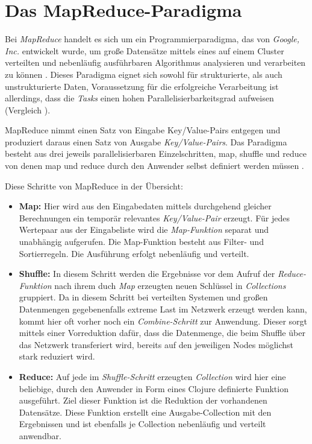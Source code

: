 \section{Das MapReduce-Paradigma}
\label{section:das mapreduce-paradigma}

Bei \textit{MapReduce} handelt es sich um ein Programmierparadigma, das von \textit{Google, Inc.} entwickelt wurde, um große Datensätze mittels eines auf einem Cluster verteilten und nebenläufig ausführbaren Algorithmus analysieren und verarbeiten zu können . Dieses Paradigma eignet sich sowohl für strukturierte, als auch unstrukturierte Daten, Voraussetzung für die erfolgreiche Verarbeitung ist allerdings, dass die \textit{Tasks} einen hohen Parallelisierbarkeitsgrad aufweisen (Vergleich ).  

MapReduce nimmt einen Satz von Eingabe Key/Value-Pairs entgegen und produziert daraus einen Satz von Ausgabe \textit{Key/Value-Pairs}. Das Paradigma besteht aus drei jeweils parallelisierbaren Einzelschritten, map, shuffle und reduce von denen map und reduce durch den Anwender selbst definiert werden müssen . 

Diese Schritte von MapReduce in der Übersicht: 

\begin{itemize}

\item \textbf{Map:} Hier wird aus den Eingabedaten mittels durchgehend gleicher Berechnungen ein temporär relevantes \textit{Key/Value-Pair} erzeugt. Für jedes Wertepaar aus der Eingabeliste wird die \textit{Map-Funktion} separat und unabhängig aufgerufen. Die Map-Funktion besteht aus Filter- und Sortierregeln. Die Ausführung erfolgt nebenläufig und verteilt. 

\item \textbf{Shuffle:} In diesem Schritt werden die Ergebnisse vor dem Aufruf der \textit{Reduce-Funktion} nach ihrem duch \textit{Map} erzeugten neuen Schlüssel in \textit{Collections} gruppiert. Da in diesem Schritt bei verteilten Systemen und großen Datenmengen gegebenenfalls extreme Last im Netzwerk erzeugt werden kann, kommt hier oft vorher noch ein \textit{Combine-Schritt} zur Anwendung. Dieser sorgt mittels einer Vorreduktion dafür, dass die Datenmenge, die beim Shuffle über das Netzwerk transferiert wird, bereits auf den jeweiligen Nodes möglichst stark reduziert wird.  

\item \textbf{Reduce:} Auf jede im \textit{Shuffle-Schritt} erzeugten \textit{Collection} wird hier eine beliebige, durch den Anwender in Form eines Clojure definierte Funktion ausgeführt. Ziel dieser Funktion ist die Reduktion der vorhandenen Datensätze. Diese Funktion erstellt eine Ausgabe-Collection mit den Ergebnissen und ist ebenfalls je Collection nebenläufig und verteilt anwendbar.

\end{itemize}





